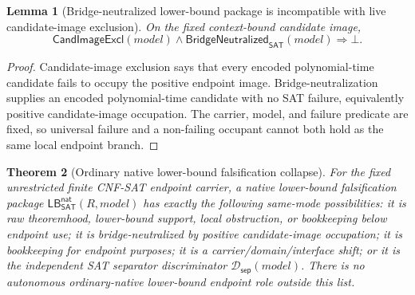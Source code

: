 \documentclass[11pt]{article}
\newtheorem{theorem}{Theorem}[section]
\newtheorem{lemma}[theorem]{Lemma}
\theoremstyle{definition}
\theoremstyle{remark}
\newcommand{\SepDisc}{\mathcal{D}_{\mathsf{sep}}}
\newcommand{\CandImageExcl}{\mathsf{CandImageExcl}}
\newcommand{\LBNatSAT}{\mathsf{LB}^{\mathsf{nat}}_{\mathsf{SAT}}}
\newcommand{\BridgeNeutralizedSAT}{\mathsf{BridgeNeutralized}_{\mathsf{SAT}}}
\begin{document}
\begin{lemma}[Bridge-neutralized lower-bound package is incompatible with live candidate-image exclusion]\label{lem:bridge-neutralized-lb-incompatible-live-exclusion}
On the fixed context-bound candidate image,
\[
  \CandImageExcl(model)\wedge\BridgeNeutralizedSAT(model)
  \Rightarrow\bot .
\]
\end{lemma}

\begin{proof}
Candidate-image exclusion says that every encoded polynomial-time candidate fails to occupy the positive endpoint image. Bridge-neutralization supplies an encoded polynomial-time candidate with no SAT failure, equivalently positive candidate-image occupation. The carrier, model, and failure predicate are fixed, so universal failure and a non-failing occupant cannot both hold as the same local endpoint branch.
\end{proof}

\begin{theorem}[Ordinary native lower-bound falsification collapse]\label{thm:ordinary-native-lb-falsification-collapse}
For the fixed unrestricted finite CNF-SAT endpoint carrier, a native lower-bound falsification package \(\LBNatSAT(R,model)\) has exactly the following same-mode possibilities: it is raw theoremhood, lower-bound support, local obstruction, or bookkeeping below endpoint use; it is bridge-neutralized by positive candidate-image occupation; it is bookkeeping for endpoint purposes; it is a carrier/domain/interface shift; or it is the independent SAT separator discriminator \(\SepDisc(model)\). There is no autonomous ordinary-native lower-bound endpoint role outside this list.
\end{theorem}
\end{document}
